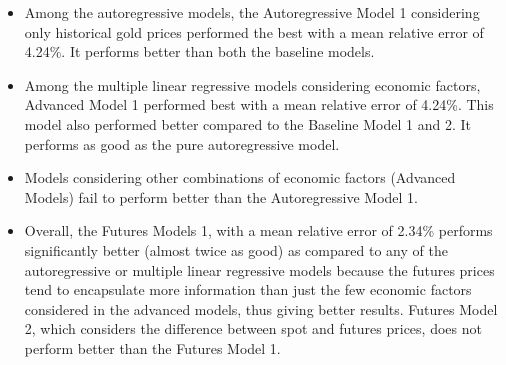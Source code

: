 \documentclass[runningheads]{llncs}
\begin{document}
\begin {itemize}

\item Among the autoregressive models, the Autoregressive Model 1 considering only historical gold prices performed the best with a mean relative error of 4.24\%. It performs better than both the baseline models. \\

\item Among the multiple linear regressive models considering economic factors, Advanced Model 1 performed best with a mean relative error of 4.24\%. This model also performed better compared to the Baseline Model 1 and 2. It performs as good as the pure autoregressive model. \\

\item Models considering other combinations of economic factors (Advanced Models) fail to perform better than the Autoregressive Model 1.\\

\item Overall, the Futures Models 1, with a mean relative error of 2.34\% performs significantly better (almost twice as good) as compared to any of the autoregressive or multiple linear regressive models because the futures prices tend to encapsulate more information than just the few economic factors considered in the advanced models, thus giving better results. Futures Model 2, which considers the difference between spot and futures prices, does not perform better than the Futures Model 1.\\

\end {itemize}
\end{document}
